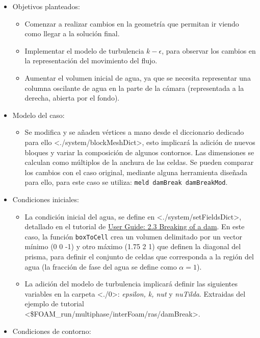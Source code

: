 \begin{itemize}
\item
  Objetivos planteados:

  \begin{itemize}
  \item
    Comenzar a realizar cambios en la geometría que permitan ir viendo
    como llegar a la solución final.
  \item
    Implementar el modelo de turbulencia \(k-\epsilon\), para observar
    los cambios en la representación del movimiento del flujo.
  \item
    Aumentar el volumen inicial de agua, ya que se necesita representar
    una columna oscilante de agua en la parte de la cámara (representada
    a la derecha, abierta por el fondo).
  \end{itemize}
\item
  Modelo del caso:

  \begin{itemize}
  \item
    Se modifica y se añaden vértices a mano desde el diccionario
    dedicado para ello \textless{}./system/blockMeshDict\textgreater{},
    esto implicará la adición de nuevos bloques y variar la composición
    de algunos contornos. Las dimensiones se calculan como múltiplos de
    la anchura de las celdas. Se pueden comparar los cambios con el caso
    original, mediante alguna herramienta diseñada para ello, para este
    caso se utiliza: \texttt{meld\ damBreak\ damBreakMod}.
  \end{itemize}
\item
  Condiciones iniciales:

  \begin{itemize}
  \item
    La condición inicial del agua, se define en
    \textless{}./system/setFieldsDict\textgreater{}, detallado en el
    tutorial de
    \href{http://cfd.direct/openfoam/user-guide/dambreak/}{User Guide:
    2.3 Breaking of a dam}. En este caso, la función \texttt{boxToCell}
    crea un volumen delimitado por un vector mínimo (0 0 -1) y otro
    máximo (1.75 2 1) que definen la diagonal del prisma, para definir
    el conjunto de celdas que corresponda a la región del agua (la
    fracción de fase del agua se define como \(\alpha=1\)).
  \item
    La adición del modelo de turbulencia implicará definir las
    siguientes variables en la carpeta \textless{}./0\textgreater{}:
    \emph{epsilon, k, nut} y \emph{nuTilda}. Extraidas del ejemplo de
    tutorial
    \textless{}\$FOAM\_run/multiphase/interFoam/ras/damBreak\textgreater{}.
  \end{itemize}
\item
  Condiciones de contorno:


\end{itemize}
